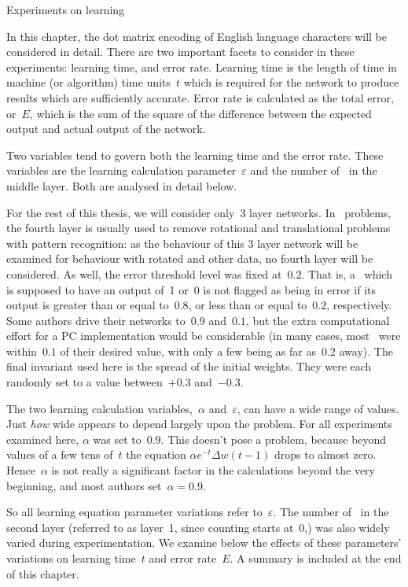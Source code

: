 \chap Experiments on learning

In this chapter, the dot matrix encoding of English language
characters will be considered in detail.
There are two important facets to consider in these experiments:
learning time, and error rate.
Learning time is the length of time in machine (or algorithm) time
units~$t$ which is required for the network to produce results which
are sufficiently accurate.
Error rate is calculated as the total error, or~$E$, which is the
sum of the square of the difference between the expected output and
actual output of the network.

Two variables tend to govern both the learning time and the error
rate.
These variables are the learning calculation parameter~$\varepsilon$ and
the number of \neus\ in the middle layer.
Both are analysed in detail below.

For the rest of this thesis, we will consider only~3 layer networks.
In \nn\ problems, the fourth layer is usually used to remove
rotational and translational problems with pattern recognition: as
the behaviour of this 3 layer network will be examined for behaviour
with rotated and other data, no fourth layer will be considered.
As well, the error threshold level was fixed at~$0.2$.
That is, a \neu\ which is supposed to have an output of~1 or~0 is
not flagged as being in error if its output is greater than or equal
to~$0.8$, or less than or equal to~$0.2$, respectively.
Some authors drive their networks to~$0.9$ and~$0.1$, but the extra
computational effort for a PC implementation would be considerable
(in many cases, most \neus\ were within~$0.1$ of their desired
value, with only a few being as far as~$0.2$ away).
The final invariant used here is the spread of the initial weights.
They were each randomly set to a value between~$+0.3$ and~$-0.3$.

The two learning calculation variables,~$\alpha$ and~$\varepsilon$,
can have a wide range of values.
Just {\sl how} wide appears to depend largely upon the problem.
For all experiments examined here, $\alpha$ was set to~$0.9$.
This doesn't pose a problem, because beyond values of a few tens of~$t$ the 
equation $\alpha e^{-t} \Delta w(t-1)$ drops to almost zero.
Hence~$\alpha$ is not really a significant factor in the
calculations beyond the very beginning, and most authors set~$\alpha = 0.9$.

So all learning equation parameter variations refer
to~$\varepsilon$.
The number of \neus\ in the second layer (referred to as layer~1, since
counting starts at~0,) was also widely varied
during experimentation.
We examine below the effects of these parameters' variations 
on learning time~$t$ and error rate~$E$.
A summary is included at the end of this chapter.

